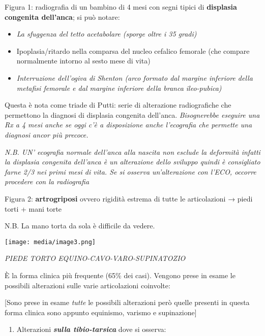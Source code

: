 \documentclass[]{article}
\begin{document}
Figura 1: radiografia di un bambino di 4 mesi con segni tipici di
\textbf{displasia congenita dell'anca}; si può notare:

\begin{itemize}
\item
  \emph{La sfuggenza del tetto acetabolare (sporge oltre i 35 gradi)}
\item
  Ipoplasia/ritardo nella comparsa del nucleo cefalico femorale (che
  compare normalmente intorno al sesto mese di vita)
\item
  \emph{Interruzione dell'ogiva di Shenton (arco formato dal margine
  inferiore della metafisi femorale e dal margine inferiore della branca
  ileo-pubica)}
\end{itemize}

Questa è nota come triade di Putti: serie di alterazione radiografiche
che permettono la diagnosi di displasia congenita dell'anca.
\emph{Bisognerebbe eseguire una Rx a 4 mesi anche se oggi c'è a
disposizione anche l'ecografia che permette una diagnosi ancor più
precoce.}

\emph{N.B. UN' ecografia normale dell'anca alla nascita non esclude la
deformità infatti la displasia congenita dell'anca è un alterazione
dello sviluppo quindi è consigliato farne 2/3 nei primi mesi di vita. Se
si osserva un'alterazione con l'ECO, occorre procedere con la
radiografia}

Figura 2: \textbf{artrogriposi} ovvero rigidità estrema di tutte le
articolazioni → piedi torti + mani torte

N.B. La mano torta da sola è difficile da vedere.

\texttt{[image: media/image3.png]}

\emph{PIEDE TORTO EQUINO-CAVO-VARO-SUPINATOZIO}

È la forma clinica più frequente (65\% dei casi). Vengono prese in esame
le possibili alterazioni sulle varie articolazioni coinvolte:

{[}Sono prese in esame \emph{tutte} le possibili alterazioni però quelle
presenti in questa forma clinica sono appunto equinismo, varismo e
supinazione{]}

\begin{enumerate}
\def\labelenumi{\arabic{enumi}.}
\item
  Alterazioni \textbf{\emph{sulla tibio-tarsica}} dove si osserva:
\end{enumerate}
\end{document}

